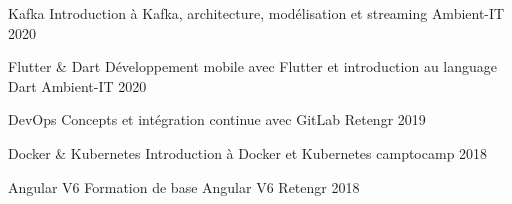


\begin{cvhonors}


\cvhonor
{Kafka} %
{Introduction à Kafka, architecture, modélisation et streaming} %
{Ambient-IT} %
{2020} %


\cvhonor
{Flutter \& Dart} %
{Développement mobile avec Flutter et introduction au language Dart} %
{Ambient-IT} %
{2020} %


\cvhonor
{DevOps} %
{Concepts et intégration continue avec GitLab} %
{Retengr} %
{2019} %


\cvhonor
{Docker \& Kubernetes} %
{Introduction à Docker et Kubernetes} %
{camptocamp} %
{2018} %


\cvhonor
{Angular V6} %
{Formation de base Angular V6} %
{Retengr} %
{2018} %


\end{cvhonors}
